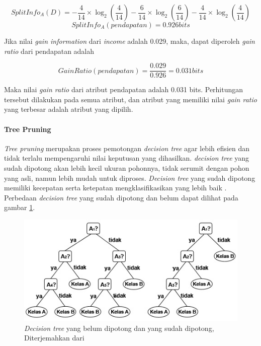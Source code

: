 \begin{displaymath}
	SplitInfo_A(D) = - \frac{4}{14} \times \log_2 (\frac{4}{14}) - \frac{6}{14} \times \log_2 (\frac{6}{14}) - \frac{4}{14} \times \log_2 (\frac{4}{14})
\end{displaymath} 
\begin{displaymath}
	SplitInfo_A(pendapatan) = 0.926 bits
\end{displaymath} 

Jika nilai \textsl{gain information} dari \textsl{income} adalah 0.029, maka, dapat diperoleh \textsl{gain ratio} dari pendapatan adalah

\begin{displaymath}
	GainRatio(pendapatan) = \frac{0.029}{0.926} = 0.031 bits
\end{displaymath}

Maka nilai \textsl{gain ratio} dari atribut pendapatan adalah 0.031 bits. Perhitungan tersebut dilakukan pada semua atribut, dan atribut yang memiliki nilai \textsl{gain ratio} yang terbesar adalah atribut yang dipilih.
\paragraph{Tree Pruning}
	
\textsl{Tree pruning} merupakan proses pemotongan \textsl{decision tree} agar lebih efisien dan tidak terlalu mempengaruhi nilai keputusan yang dihasilkan. \textsl{decision tree} yang sudah dipotong akan lebih kecil ukuran pohonnya, tidak serumit dengan pohon yang asli, namun lebih mudah untuk diproses. \textsl{Decision tree} yang sudah dipotong memiliki kecepatan serta ketepatan mengklasifikasikan yang lebih baik \cite{DM}. Perbedaan \textsl{decision tree} yang sudah dipotong dan belum dapat dilihat pada gambar \ref{fig:treePruning}.

\begin{figure}
\centering
\includegraphics[scale=1]{Gambar/treepruning.jpg}
\caption[\textsl{Decision Tree Pruned}]{\textsl{Decision tree} yang belum dipotong dan yang sudah dipotong, Diterjemahkan dari \cite{DM}} 
\label{fig:treePruning}
\end{figure}

